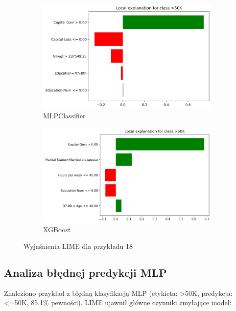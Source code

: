 \documentclass[12pt,a4paper]{article}
\begin{document}
\begin{figure}[H]
  \centering
  \begin{subfigure}{0.45\textwidth}
    \centering
    \includegraphics[width=\textwidth]{../out/mlp-18.png}
    \caption{MLPClassifier}
  \end{subfigure}
  \begin{subfigure}{0.45\textwidth}
    \centering
    \includegraphics[width=\textwidth]{../out/xgboost-18.png}
    \caption{XGBoost}
  \end{subfigure}
  \caption{Wyjaśnienia LIME dla przykładu 18}
\end{figure}

\subsection{Analiza błędnej predykcji MLP}

Znaleziono przykład z błędną klasyfikacją MLP (etykieta: >50K, predykcja: <=50K, 85.1\% pewności). LIME ujawnił główne czynniki zmyłające model:
\end{document}
